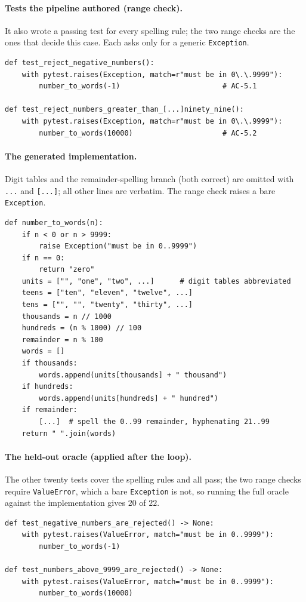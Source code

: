 \documentclass{article}
\begin{document}
\paragraph{Tests the pipeline authored (range check).} It also wrote a passing test for every
spelling rule; the two range checks are the ones that decide this case. Each asks only for a
generic \texttt{Exception}.
\begin{small}
\begin{verbatim}
def test_reject_negative_numbers():
    with pytest.raises(Exception, match=r"must be in 0\.\.9999"):
        number_to_words(-1)                        # AC-5.1

def test_reject_numbers_greater_than_[...]ninety_nine():
    with pytest.raises(Exception, match=r"must be in 0\.\.9999"):
        number_to_words(10000)                     # AC-5.2
\end{verbatim}
\end{small}

\paragraph{The generated implementation.} Digit tables and the remainder-spelling branch (both
correct) are omitted with \texttt{...} and \texttt{[...]}; all other lines are verbatim. The range
check raises a bare \texttt{Exception}.
\begin{small}
\begin{verbatim}
def number_to_words(n):
    if n < 0 or n > 9999:
        raise Exception("must be in 0..9999")
    if n == 0:
        return "zero"
    units = ["", "one", "two", ...]      # digit tables abbreviated
    teens = ["ten", "eleven", "twelve", ...]
    tens = ["", "", "twenty", "thirty", ...]
    thousands = n // 1000
    hundreds = (n % 1000) // 100
    remainder = n % 100
    words = []
    if thousands:
        words.append(units[thousands] + " thousand")
    if hundreds:
        words.append(units[hundreds] + " hundred")
    if remainder:
        [...]  # spell the 0..99 remainder, hyphenating 21..99
    return " ".join(words)
\end{verbatim}
\end{small}

\paragraph{The held-out oracle (applied after the loop).} The other twenty tests cover the
spelling rules and all pass; the two range checks require \texttt{ValueError}, which a bare
\texttt{Exception} is not, so running the full oracle against the implementation gives $20$ of
$22$.
\begin{small}
\begin{verbatim}
def test_negative_numbers_are_rejected() -> None:
    with pytest.raises(ValueError, match="must be in 0..9999"):
        number_to_words(-1)

def test_numbers_above_9999_are_rejected() -> None:
    with pytest.raises(ValueError, match="must be in 0..9999"):
        number_to_words(10000)
\end{verbatim}
\end{small}
\end{document}
